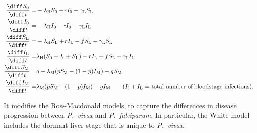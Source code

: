 \begin{align*}
    \frac{\diff S_0}{\diff t} =          & -\lambda_\mathrm{H} S_0 + rI_0 + \gamma_\mathrm{L}S_\mathrm{L}                                                                            \\
    \frac{\diff I_0}{\diff t} =          & -\lambda_\mathrm{H} I_0 - rI_0 + \gamma_\mathrm{L}I_\mathrm{L}                                                                            \\
    \frac{\diff S_\mathrm{L}}{\diff t} = & -\lambda_\mathrm{H} S_\mathrm{L} + rI_\mathrm{L} - fS_\mathrm{L} -\gamma_\mathrm{L}S_\mathrm{L}                                           \\
    \frac{\diff I_\mathrm{L}}{\diff t} = & \lambda_\mathrm{H} (S_0 + I_0 + S_\mathrm{L}) - rI_\mathrm{L} + fS_\mathrm{L} -\gamma_\mathrm{L}I_\mathrm{L}                              \\
    \frac{\diff S_\mathrm{M}}{\diff t} = & g - \lambda_\mathrm{M}(pS_\mathrm{M} - (1 - p)I_\mathrm{M}) - gS_\mathrm{M}                                                               \\
    \frac{\diff I_\mathrm{M}}{\diff t} = & \lambda_\mathrm{M}(pS_\mathrm{M} - (1 - p)I_\mathrm{M}) - gI_\mathrm{M}\tag{$I_0 + I_\mathrm{L}=$ total number of bloodstage infections}.
\end{align*}

It modifies the Ross-Macdonald models, to capture the differences in disease progression between \textit{P.\ vivax} and \textit{P.\ falciparum}. In particular, the White model includes the dormant liver stage that is unique to \textit{P.\ vivax}.

